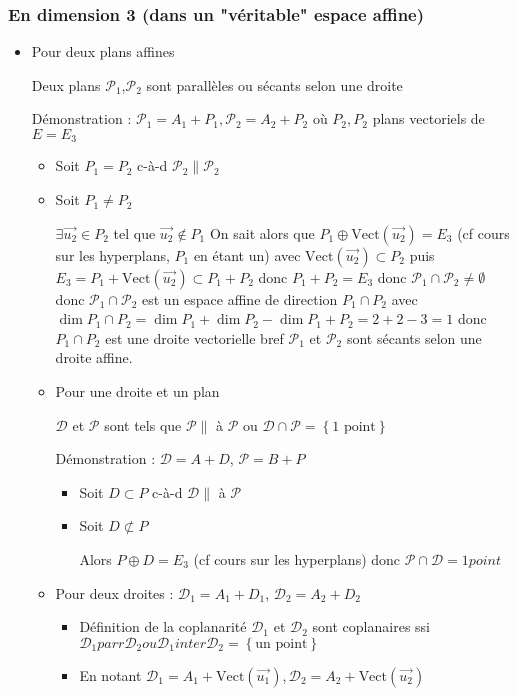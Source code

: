 \documentclass[12pt,a4paper,french]{book}
\begin{document}
			\subsubsection{En dimension 3 (dans un "véritable" espace affine)}
				\begin{itemize}
					\item Pour deux plans affines
					
					Deux plans $\mathcal{P}_1$,$\mathcal{P}_2$ sont parallèles ou sécants selon une droite
					
					Démonstration : $\mathcal{P}_1 = A_1 + P_1, \mathcal{P}_2 = A_2 + P_2$ où $P_2, P_2$ plans vectoriels de $E = E_3$
					\begin{itemize}
						\item Soit $P_1 = P_2$ c-à-d $\mathcal{P}_2 \parallel \mathcal{P}_2$
						\item Soit $P_1 \neq P_2$
						
						$\exists \overrightarrow{u_2} \in P_2$ tel que $\overrightarrow{u_2} \notin P_1$
						On sait alors que $P_1 \oplus \mbox{Vect}(\overrightarrow{u_2}) = E_3$ (cf cours sur les hyperplans, $P_1$ en étant un) avec $\mbox{Vect}(\overrightarrow{u_2}) \subset P_2$
						puis $E_3 = P_1+\mbox{Vect}(\overrightarrow{u_2}) \subset P_1 + P_2$ donc $P_1 + P_2 = E_3$
						donc $\mathcal{P}_1 \cap \mathcal{P}_2 \neq \emptyset$ donc $\mathcal{P}_1 \cap \mathcal{P}_2$ est un espace affine de direction $P_1 \cap P_2$
						avec $\dim P_1 \cap P_2 = \dim P_1 + \dim P_2 - \dim P_1+P_2 = 2+2-3 = 1$ donc $P_1 \cap P_2$ est une droite vectorielle bref $\mathcal{P}_1$ et $\mathcal{P}_2$ sont sécants selon une droite affine.
						
					\item Pour une droite et un plan
					
					$\mathcal{D}$ et $\mathcal{P}$ sont tels que $\mathcal{P} \parallel $ à $ \mathcal{P}$ ou $\mathcal{D} \cap \mathcal{P} = \left\lbrace \mbox{1 point} \right\rbrace $
					
					Démonstration : $\mathcal{D}= A + D$, $\mathcal{P} = B + P$
						\begin{itemize}
							\item Soit $D \subset P$ c-à-d $\mathcal{D} \parallel$ à $\mathcal{P}$
							\item Soit $D \not\subset P$
							
							Alors $P \oplus D = E_3$ (cf cours sur les hyperplans)
							donc $\mathcal{P} \cap \mathcal{D} = {1 point}$
						\end{itemize} 
					\item  Pour deux droites : $\mathcal{D}_1 = A_1 + D_1$, $\mathcal{D}_2 = A_2 + D_2$
						\begin{itemize}
							\item Définition de la coplanarité
								$\mathcal{D}_1$ et $\mathcal{D}_2$ sont coplanaires ssi $\mathcal{D}_1 parr \mathcal{D}_2 ou \mathcal{D}_1 inter \mathcal{D}_2 = \left\lbrace \mbox{un point}\right\rbrace $
							\item En notant $\mathcal{D}_1 = A_1 + \mbox{Vect}(\overrightarrow{u_1}), \mathcal{D}_2 = A_2 + \mbox{Vect}(\overrightarrow{u_2})$
							

\end{itemize}
\end{itemize}
\end{itemize}
\end{document}
